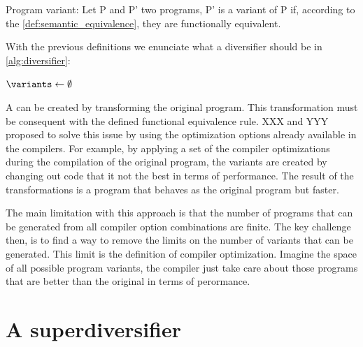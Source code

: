 \begin{definition}{Program variant:}
    \label{def:variant}
    Let P and P' two programs, P' is a variant of P if, according to the \autoref{def:semantic_equivalence}, they are functionally equivalent.
\end{definition}
    

With the previous definitions we enunciate what a diversifier should be in \autoref{alg:diversifier}:


\begin{algorithm}[H]

    $\variants \leftarrow \emptyset$ \;
    
    \caption{Program diversifier}
\label{alg:diversifier}

\end{algorithm}

A can be created by transforming the original program. This transformation must be consequent with the defined functional equivalence rule. 
XXX and YYY proposed to solve this issue by using the optimization options already available in the compilers. For example, by applying a set of the compiler optimizations during the compilation of the original program, the variants are created by changing out code that it not the best in terms of performance. The result of the transformations is a program that behaves as the original program but faster. 

The main limitation with this approach is that the number of programs that can be generated from all compiler option combinations are finite. The key challenge then, is to find a way to remove the limits on the number of variants that can be generated. This limit is the definition of compiler optimization.  Imagine the space of all possible program variants, the compiler just take care about those programs that are better than the original in terms of perormance.


\section{A superdiversifier}

